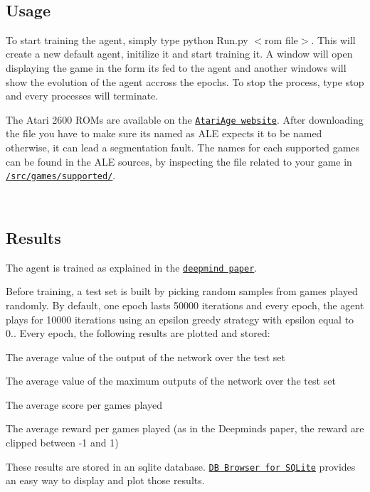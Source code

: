 ~ \subsection*{Usage}

To start training the agent, simply type {\ttfamily python Run.\+py $<$rom file$>$}. This will create a new default agent, initilize it and start training it. A window will open displaying the game in the form it\textquotesingle{}s fed to the agent and another windows will show the evolution of the agent accross the epochs. To stop the process, type {\ttfamily stop} and every processes will terminate.

The Atari 2600 R\+O\+Ms are available on the \href{http://www.atariage.com/system_items.html?SystemID=2600&ItemTypeID=ROM}{\tt Atari\+Age website}. After downloading the file you have to make sure it\textquotesingle{}s named as A\+LE expects it to be named otherwise, it can lead a segmentation fault. The names for each supported games can be found in the A\+LE sources, by inspecting the file related to your game in \href{https://github.com/mgbellemare/Arcade-Learning-Environment/tree/master/src/games/supported}{\tt /src/games/supported/}.

~ \subsection*{Results}

The agent is trained as explained in the \href{https://arxiv.org/abs/1312.5602}{\tt deepmind paper}.

Before training, a test set is built by picking random samples from games played randomly. By default, one epoch lasts 50000 iterations and every epoch, the agent plays for 10000 iterations using an epsilon greedy strategy with epsilon equal to 0.. Every epoch, the following results are plotted and stored\+:
\begin{DoxyItemize}
\item The average value of the output of the network over the test set
\item The average value of the maximum outputs of the network over the test set
\item The average score per games played
\item The average reward per games played (as in the Deepmind\textquotesingle{}s paper, the reward are clipped between -\/1 and 1)
\end{DoxyItemize}

These results are stored in an sqlite database. \href{https://github.com/sqlitebrowser/sqlitebrowser}{\tt DB Browser for S\+Q\+Lite} provides an easy way to display and plot those results.

